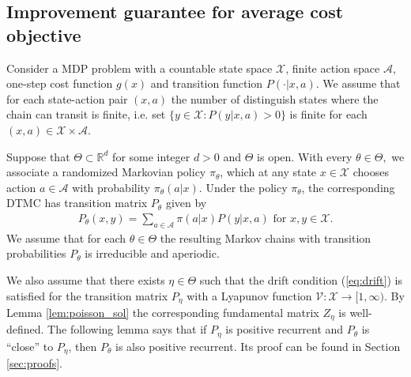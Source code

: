 \documentclass[11pt]{article}
\newcommand{\R}{\mathbb{R}}
\newcommand{\X}{\mathcal{X}}
\newcommand{\A}{\mathcal{A}}
\newcommand{\V}{\mathcal{V}}
\theoremstyle{definition}
\numberwithin{equation}{section}
\begin{document}
 \subsection{Improvement guarantee for average cost objective}\label{sec:TRPOforAC}

Consider a MDP problem with a countable state space $\X$, finite action space $\A$, one-step cost function $g(x)$ and  transition function $P(\cdot|x, a)$. We assume that for each state-action pair $(x, a)$ the number of distinguish states where the chain can transit is finite, i.e. set $\{y\in \X: P(y| x, a)>0\}$ is finite for each $(x, a)\in \X\times \A.$


Suppose that $\Theta\subset \R^d$ for some integer $d>0$ and
  $\Theta$ is open.  With every $\theta\in \Theta,$ we associate a
randomized Markovian policy $\pi_{\theta}$, which at any state
$x\in \X$ chooses action $a\in \A$ with probability
$\pi_\theta(a|x)$. Under the policy $\pi_{\theta}$, the corresponding DTMC has transition matrix $P_{\theta}$ given by
\begin{align*} P_\theta(x, y) = \sum\limits_{a\in \A} \pi(a|x)P(y|x, a) \text{ for } x, y\in \X.
\end{align*}
We assume that for each $\theta\in \Theta$ the resulting Markov chains with transition probabilities $P_{\theta}$ is irreducible and aperiodic.

We also assume that there exists $\eta \in \Theta$ such that the drift
condition (\ref{eq:drift}) is satisfied for the transition matrix
$P_\eta$ with a Lyapunov function $\V:\X\rightarrow [1, \infty).$ By
Lemma \ref{lem:poisson_sol} the corresponding fundamental matrix
$Z_\eta$ is well-defined. The following lemma says that if $P_{\eta}$ is positive
recurrent and $P_\theta$ is ``close'' to $P_\eta$, then $P_\theta$ is
also positive recurrent.
Its proof can be found in Section \ref{sec:proofs}.

%
%
\end{document}
